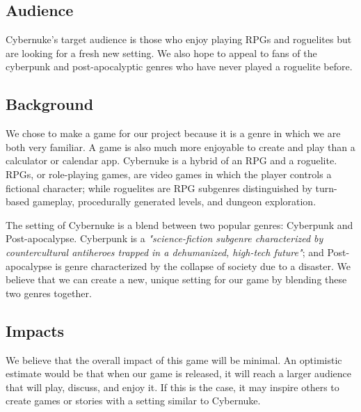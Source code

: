 \documentclass[10pt,conference,onecolumn,compsoc]{IEEEtran}
\begin{document}

\subsection{Audience}
Cybernuke's target audience is those who enjoy playing RPGs and roguelites but are looking for a fresh new setting. We also hope to appeal to fans of the cyberpunk and post-apocalyptic genres who have never played a roguelite before. 


\subsection{Background}
We chose to make a game for our project because it is a genre in which we are both very familiar. A game is also much more enjoyable to create and play than a calculator or calendar app. Cybernuke is a hybrid of an RPG and a roguelite. RPGs, or role-playing games, are video games in which the player controls a fictional character; while roguelites are RPG subgenres distinguished by turn-based gameplay, procedurally generated levels, and dungeon exploration. 

The setting of Cybernuke is a blend between two popular genres: Cyberpunk and Post-apocalypse.  Cyberpunk is a \emph{"science-fiction subgenre characterized by countercultural antiheroes trapped in a dehumanized, high-tech future"}\cite{IEEEhowto:cyberpunk}; and Post-apocalypse is genre characterized by the collapse of society due to a disaster. We believe that we can create a new, unique setting for our game by blending these two genres together.

\subsection{Impacts}
We believe that the overall impact of this game will be minimal. An optimistic estimate would be that when our game is released, it will reach a larger audience that will play, discuss, and enjoy it. If this is the case, it may inspire others to create games or stories with a setting similar to Cybernuke.
\end{document}
